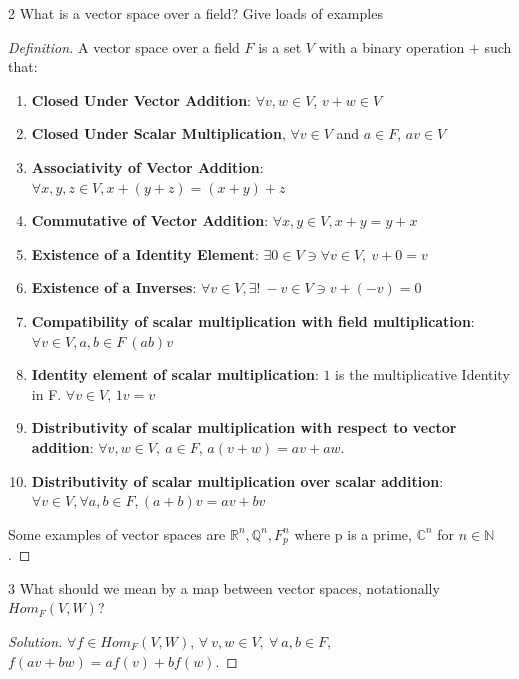 \documentclass{article}
\newcommand{\C}{\mathbb{C}}
\newcommand{\R}{\mathbb{R}}
\newcommand{\Q}{\mathbb{Q}}
\newcommand{\N}{\mathbb{N}}
\newenvironment{solution}
{\renewcommand\qedsymbol{$\blacksquare$}\begin{proof}[Solution]}
{\end{proof}}
\newenvironment{definition}
{\renewcommand\qedsymbol{$\blacksquare$}\begin{proof}[Definition]}
{\end{proof}}
\begin{document}
\begin{PROB}{2}\label{Problem 2.}
    What is a vector space over a field? Give loads of examples
\end{PROB}
\begin{definition}
    A vector space over a field $F$ is a set $V$ with a binary operation $+$ such that:

    \begin{enumerate}
        \item \textbf{Closed Under Vector Addition}: $\forall v, w \in V$, $v + w \in V$
        \item \textbf{Closed Under Scalar Multiplication}, $\forall v \in V$ and $a \in F$, $av \in V$
        \item \textbf{Associativity of Vector Addition}: $\forall x, y, z \in V, x + (y + z) = (x + y) + z$
        \item \textbf{Commutative of Vector Addition}: $\forall x, y \in V, x + y = y + x$
        \item \textbf{Existence of a Identity Element}: $\exists 0 \in V \ni \forall v \in V, ~ v + 0 = v$
        \item \textbf{Existence of a Inverses}: $\forall v \in V, \exists! ~ -v \in V \ni v + (-v) = 0$
        \item \textbf{Compatibility of scalar multiplication with field multiplication}: $\forall v \in V, a, b \in F ~ (ab)v$
        \item \textbf{Identity element of scalar multiplication}: $1$ is the multiplicative Identity in F. $\forall v \in V$, $1v = v$
        \item \textbf{Distributivity of scalar multiplication with respect to vector addition}: $\forall v, w  \in V, ~ a \in F$, $a(v + w) = av + aw$.
        \item \textbf{Distributivity of scalar multiplication over scalar addition}: $\forall v \in V, \forall a, b \in F, (a + b)v = av + bv$
    \end{enumerate}

    Some examples of vector spaces are $\R^n, \Q^n, F_p^n$ where p is a prime, $\C^n$ for $n \in \N$.
\end{definition}

\bigskip

\begin{PROB}{3}\label{Problem 3.}
    What should we mean by a map between vector spaces, notationally $Hom_F(V,W)$?
\end{PROB}
\begin{solution}
    $\forall f \in Hom_F(V, W)$, $\forall~v, w \in V,~\forall~a, b \in F$, $f(av + bw) = af(v) + bf(w)$.
\end{solution}
\end{document}
